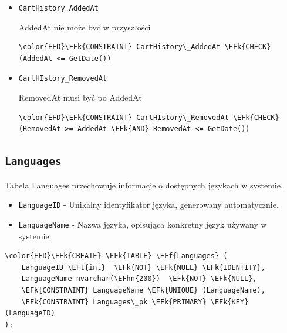 \documentclass[11pt]{article}
\newcommand{\EFk}[1]{\textcolor{EFk}{\textbf{#1}}} %
\newcommand{\EFf}[1]{\textcolor{EFf}{#1}} %
\newcommand{\EFt}[1]{\textcolor{EFt}{\textbf{#1}}} %
\newcommand{\EFhn}[1]{\textcolor{EFhn}{#1}} %
\begin{document}
\begin{itemize}
\item \texttt{CartHistory\_AddedAt}

AddedAt nie może być w przyszłości
\begin{Code}
\begin{Verbatim}
\color{EFD}\EFk{CONSTRAINT} CartHistory\_AddedAt \EFk{CHECK}
(AddedAt <= GetDate())
\end{Verbatim}
\end{Code}
\item \texttt{CartHIstory\_RemovedAt}

RemovedAt musi być po AddedAt
\begin{Code}
\begin{Verbatim}
\color{EFD}\EFk{CONSTRAINT} CartHIstory\_RemovedAt \EFk{CHECK}
(RemovedAt >= AddedAt \EFk{AND} RemovedAt <= GetDate())
\end{Verbatim}
\end{Code}
\end{itemize}
\subsection{\texttt{Languages}}
\label{sec:org45e2f5f}
Tabela Languages przechowuje informacje o dostępnych językach w systemie.
\begin{itemize}
\item \texttt{LanguageID} - Unikalny identyfikator języka, generowany automatycznie.
\item \texttt{LanguageName} - Nazwa języka, opisująca konkretny język używany w systemie.
\end{itemize}
\begin{Code}
\begin{Verbatim}
\color{EFD}\EFk{CREATE} \EFk{TABLE} \EFf{Languages} (
    LanguageID \EFt{int}  \EFk{NOT} \EFk{NULL} \EFk{IDENTITY},
    LanguageName nvarchar(\EFhn{200})  \EFk{NOT} \EFk{NULL},
    \EFk{CONSTRAINT} LanguageName \EFk{UNIQUE} (LanguageName),
    \EFk{CONSTRAINT} Languages\_pk \EFk{PRIMARY} \EFk{KEY}  (LanguageID)
);
\end{Verbatim}
\end{Code}
\end{document}
